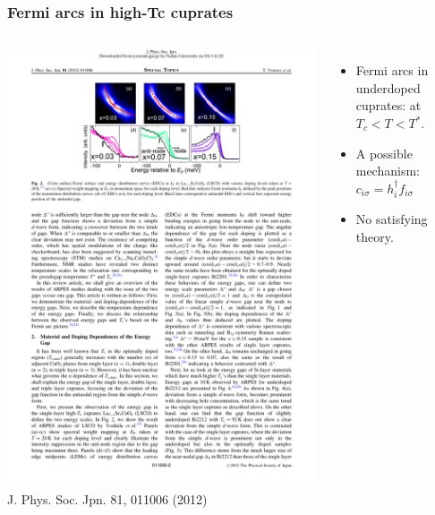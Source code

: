 \documentclass[xcolor=table, 10pt, aspectratio=1610]{beamer}
\begin{document}
\begin{frame}
	\frametitle{Fermi arcs in high-Tc cuprates}
	\begin{columns}
		\includegraphics{arc_arpes}
		{\small J. Phys. Soc. Jpn. 81, 011006 (2012)}
		\begin{itemize}
			\item Fermi arcs in underdoped cuprates: at $T_c<T<T^*$.
			\vspace{3em}
			\item A possible mechanism:
			$c_{i\sigma} = h_i^\dagger f_{i\sigma}$
			\vspace{3em}
			\item No satisfying theory.
		\end{itemize}
	\end{columns}
\end{frame}
\end{document}
